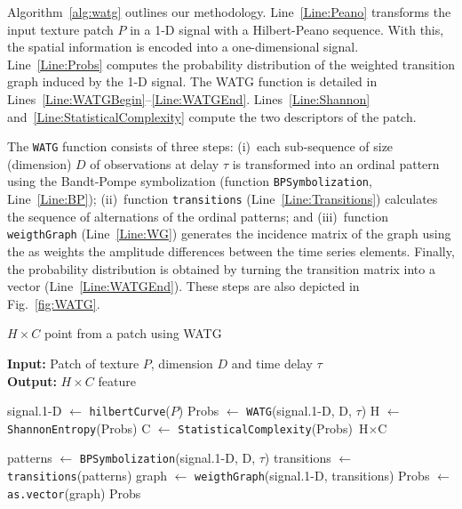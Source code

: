 \documentclass[journal]{IEEEtran}
\begin{document}
Algorithm~\ref{alg:watg} outlines our methodology.
Line~\ref{Line:Peano} transforms the input texture patch $P$ in a \mbox{1-D} signal with a Hilbert-Peano sequence.
%
With this, the spatial information is encoded into a one-dimensional signal.
%
Line~\ref{Line:Probs} computes 
the probability distribution of the weighted transition graph induced by the \mbox{1-D} signal.
The WATG function is detailed in Lines~\ref{Line:WATGBegin}--\ref{Line:WATGEnd}.
%
Lines~\ref{Line:Shannon} and~\ref{Line:StatisticalComplexity} compute the two descriptors of the patch.

The \texttt{WATG} function consists of three steps: 
(i)~each sub-sequence of size (dimension) $D$ of observations at delay $\tau$ is transformed into an ordinal pattern using the Bandt-Pompe symbolization (function \texttt{BPSymbolization}, Line~\ref{Line:BP}); 
(ii)~function \texttt{transitions} (Line~\ref{Line:Transitions}) calculates the sequence of alternations of the ordinal patterns; and 
(iii)~function \texttt{weigthGraph} (Line~\ref{Line:WG}) generates the incidence matrix of the graph using the as weights the amplitude differences between the time series elements.
Finally, the probability distribution is obtained by turning the transition matrix into a vector (Line~\ref{Line:WATGEnd}).
These steps are also depicted in Fig.~\ref{fig:WATG}.

\begin{algorithm}
	\caption{$H \times C$ point from a patch using WATG}
	\label{alg:watg}                                
	\textbf{Input:} Patch of texture $P$, dimension $D$ and time delay \textbf{$\tau$}\\
	\textbf{Output:} $H \times C$ feature
	\begin{algorithmic}[1]
		\State signal.\mbox{1-D} $\gets$ \texttt{hilbertCurve}($P$) \label{Line:Peano}
		\State Probs $\gets$ \texttt{WATG}(signal.\mbox{1-D}, D, $\tau$) \label{Line:Probs}
		\State H $\gets$ \texttt{ShannonEntropy}(Probs) \label{Line:Shannon}
		\State C $\gets$ \texttt{StatisticalComplexity}(Probs) \label{Line:StatisticalComplexity}
		\State \Return $\text{H}\times\text{C}$
		
		\vspace{0.15cm}
		
		\State patterns $\gets$ \label{Line:WATGBegin} \texttt{BPSymbolization}(signal.\mbox{1-D}, D, $\tau$) \label{Line:BP}
		\State transitions $\gets$ \texttt{transitions}(patterns) \label{Line:Transitions}
		\State graph $\gets$ \texttt{weigthGraph}(signal.\mbox{1-D}, transitions) \label{Line:WG}
		\State Probs $\gets$ \texttt{as.vector}(graph) \label{Line:WATGEnd}
		\State \Return Probs
		\EndFunction
	\end{algorithmic}
\end{algorithm}
\end{document}
